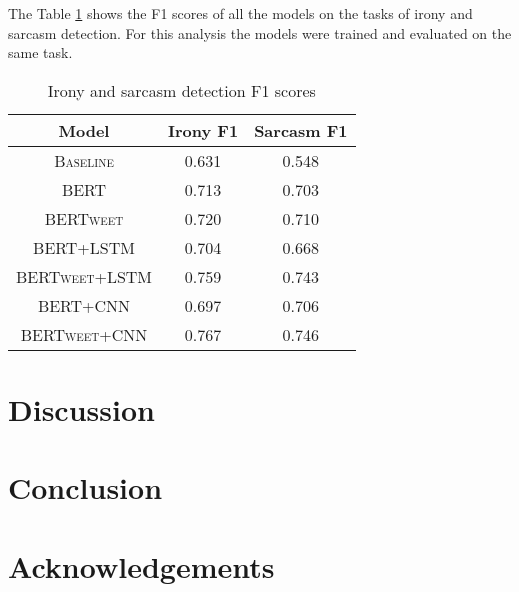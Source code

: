 \documentclass[10pt, a4paper]{article}
\begin{document}
The Table \ref{tab:correlation} shows the F1 scores of all the models on the tasks of irony and sarcasm detection.
For this analysis the models were trained and evaluated on the same task.

\begin{table}[h!]
   \caption{Irony and sarcasm detection F1 scores}
   \label{tab:correlation}
   \begin{center}
   \begin{tabular}{|c|c|c|}
   \toprule
   Model & Irony F1 & Sarcasm F1 \\
   \midrule
   \textsc{Baseline} & 0.631 & 0.548 \\
   \textsc{BERT} & 0.713 & 0.703 \\
   \textsc{BERTweet} & 0.720 & 0.710 \\
   \textsc{BERT+LSTM} & 0.704 & 0.668 \\
   \textsc{BERTweet+LSTM} & 0.759 & 0.743 \\
   \textsc{BERT+CNN} & 0.697 & 0.706 \\
   \textsc{BERTweet+CNN} & 0.767 & 0.746 \\
   \bottomrule
   \end{tabular}
   \end{center}
\end{table}

\section{Discussion}

\section{Conclusion}

\section*{Acknowledgements}


 
\end{document}
